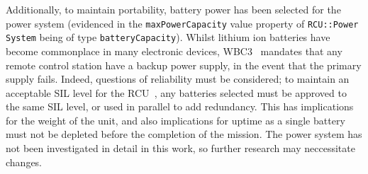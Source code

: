 \documentclass[../main.tex]{subfiles}
\begin{document}
Additionally, to maintain portability, battery power has been selected for the power system (evidenced in the \texttt{maxPowerCapacity} value property of \texttt{RCU::Power System} being of type \texttt{batteryCapacity}).
Whilst lithium ion batteries have become commonplace in many electronic devices, WBC3~\cite{WBC3} mandates that any remote control station have a backup power supply, in the event that the primary supply fails.
Indeed, questions of reliability must be considered; to maintain an acceptable SIL level for the RCU~\cite{IEC61508}, any batteries selected must be approved to the same SIL level, or used in parallel to add redundancy.
This has implications for the weight of the unit, and also implications for uptime as a single battery must not be depleted before the completion of the mission.
The power system has not been investigated in detail in this work, so further research may neccessitate changes.
\end{document}
